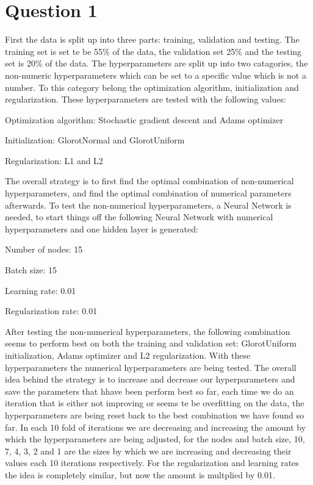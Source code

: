 \section{Question 1}
First the data is split up into three parts: training, validation and testing. The training set is set te be 55\% of the data, the validation set 25\% and the testing set is 20\% of the data. 
The hyperparameters are split up into two catagories, the non-numeric hyperparameters which can be set to a specific value which is not a number. To this category belong the optimization algorithm, initialization and regularization. These hyperparameters are tested with the following values:
\begin{description}
	\item Optimization algorithm: Stochastic gradient descent and Adams optimizer
	\item Initialization: GlorotNormal and GlorotUniform
	\item Regularization: L1 and L2
\end{description}
The overall strategy is to first find the optimal combination of non-numerical hyperparameters, and find the optimal combination of numerical parameters afterwards. To test the non-numerical hyperparameters, a Neural Network is needed, to start things off the following Neural Network with numerical hyperparameters and one hidden layer is generated:
\begin{description}
	\item Number of nodes: 15  
	\item Batch size: 15
	\item Learning rate: 0.01
	\item Regularization rate: 0.01
\end{description}
After testing the non-numerical hyperparameters, the following combination seems to perform best on both the training and validation set: GlorotUniform initialization, Adams optimizer and L2 regularization. With these hyperparameters the numerical hyperparameters are being tested. The overall idea behind the strategy is to increase and decrease our hyperparameters and save the parameters that hhave been perform best so far, each time we do an iteration that is either not improving or seems te be overfitting on the data, the hyperparameters are being reset back to the best combination we have found so far. In each 10 fold of iterations we are decreasing and increasing the amount by which the hyperparameters are being adjusted, for the nodes and batch size, 10, 7, 4, 3, 2 and 1 are the sizes by which we are increasing and decreasing their values each 10 iterations respectively. For the regularization and learning rates the idea is completely similar, but now the amount is multplied by 0.01. 
